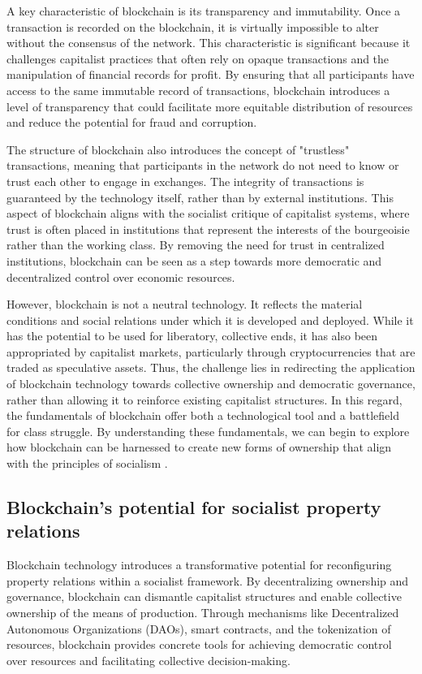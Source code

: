 \begin{refsection}
A key characteristic of blockchain is its transparency and immutability. Once a transaction is recorded on the blockchain, it is virtually impossible to alter without the consensus of the network. This characteristic is significant because it challenges capitalist practices that often rely on opaque transactions and the manipulation of financial records for profit. By ensuring that all participants have access to the same immutable record of transactions, blockchain introduces a level of transparency that could facilitate more equitable distribution of resources and reduce the potential for fraud and corruption.

The structure of blockchain also introduces the concept of "trustless" transactions, meaning that participants in the network do not need to know or trust each other to engage in exchanges. The integrity of transactions is guaranteed by the technology itself, rather than by external institutions. This aspect of blockchain aligns with the socialist critique of capitalist systems, where trust is often placed in institutions that represent the interests of the bourgeoisie rather than the working class. By removing the need for trust in centralized institutions, blockchain can be seen as a step towards more democratic and decentralized control over economic resources.

However, blockchain is not a neutral technology. It reflects the material conditions and social relations under which it is developed and deployed. While it has the potential to be used for liberatory, collective ends, it has also been appropriated by capitalist markets, particularly through cryptocurrencies that are traded as speculative assets. Thus, the challenge lies in redirecting the application of blockchain technology towards collective ownership and democratic governance, rather than allowing it to reinforce existing capitalist structures. In this regard, the fundamentals of blockchain offer both a technological tool and a battlefield for class struggle. By understanding these fundamentals, we can begin to explore how blockchain can be harnessed to create new forms of ownership that align with the principles of socialism \cite[pp.~55-58]{nakamoto2008}.

\subsection{Blockchain's potential for socialist property relations}

Blockchain technology introduces a transformative potential for reconfiguring property relations within a socialist framework. By decentralizing ownership and governance, blockchain can dismantle capitalist structures and enable collective ownership of the means of production. Through mechanisms like Decentralized Autonomous Organizations (DAOs), smart contracts, and the tokenization of resources, blockchain provides concrete tools for achieving democratic control over resources and facilitating collective decision-making.


\end{refsection}
